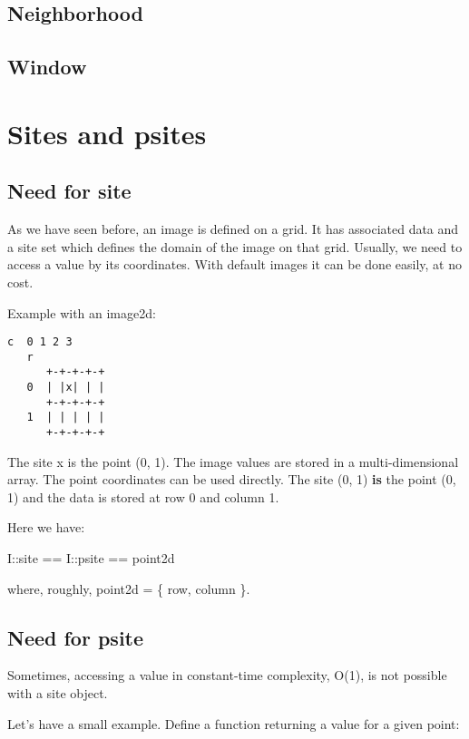 \documentclass{report}
\begin{document}
\newpage
\section{Neighborhood}



\newpage
\section{Window}




\chapter{Sites and psites}

\section{Need for site}

As we have seen before, an image is defined on a grid. It has associated
data and a site set which defines the domain of the image on that grid.
Usually, we need to access a value by its coordinates. With default images it
can be done easily, at no cost.

Example with an image2d:

\begin{lstlisting}[frame=single]
    c  0 1 2 3
   r
      +-+-+-+-+
   0  | |x| | |
      +-+-+-+-+
   1  | | | | |
      +-+-+-+-+
\end{lstlisting}

The site x is the point (0, 1).  The image values are stored in a
multi-dimensional array. The point coordinates can be used directly. The site
(0, 1) \textbf{is} the point (0, 1) and the data is stored at row 0 and column
1.

Here we have:

  I::site == I::psite == point2d

where, roughly, point2d = \{ row, column \}.

\section{Need for psite}

Sometimes, accessing a value in constant-time complexity, O(1), is not
possible with a site object.

Let's have a small example. Define a function returning a value for a given
point:
\end{document}
